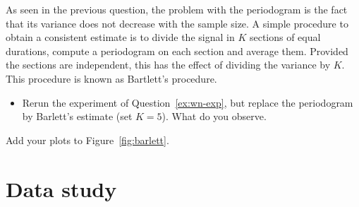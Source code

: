 \documentclass[11pt]{article}
\begin{document}
\begin{solution}
    
\end{solution}

\begin{exercise}\label{q:barlett}
    As seen in the previous question, the problem with the periodogram is the fact that its variance does not decrease with the sample size.
    A simple procedure to obtain a consistent estimate is to divide the signal in $K$ sections of equal durations, compute a periodogram on each section and average them.
    Provided the sections are independent, this has the effect of dividing the variance by $K$. 
    This procedure is known as Bartlett's procedure.
    \begin{itemize}
        \item Rerun the experiment of Question~\ref{ex:wn-exp}, but replace the periodogram by Barlett's estimate (set $K=5$). What do you observe.
    \end{itemize}
    Add your plots to Figure~\ref{fig:barlett}.
\end{exercise}

\section{Data study}
\end{document}
